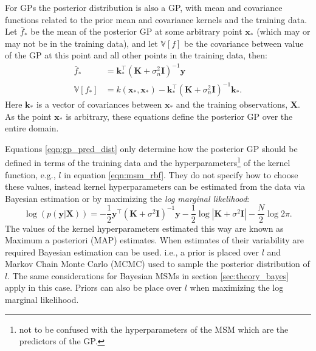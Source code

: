 For GPs the posterior distribution is also a GP, with mean and covariance functions related to the prior mean and covariance kernels and the training data\cite{rasmussenGaussianProcessesMachine2006}. Let $\bar{f}_{*}$ be the mean of the posterior GP at some arbitrary point $\mathbf{x}_{*}$ (which may or may not be in the training data), and let $\mathbb{V}\left[f\right]$ be the covariance between value of the GP at this point and all other points in the training data, then\cite{rasmussenGaussianProcessesMachine2006}:
\begin{equation}\label{eqn:gp_pred_dist}
\begin{aligned}
\bar{f}_{*} &=\mathbf{k}_{*}^{\top}\left(\mathbf{K}+\sigma_{n}^{2} \mathbf{I}\right)^{-1} \mathbf{y} \\
\mathbb{V}\left[f_{*}\right] &=k\left(\mathbf{x}_{*}, \mathbf{x}_{*}\right)-\mathbf{k}_{*}^{\top}\left(\mathbf{K}+\sigma_{n}^{2} \mathbf{I}\right)^{-1} \mathbf{k}_{*}.
\end{aligned}
\end{equation}
Here $\mathbf{k}_{*}$ is a vector of covariances between $\mathbf{x}_{*}$ and the training observations, $\mathbf{X}$. As the point $\mathbf{x}_{*}$ is arbitrary, these equations define the posterior GP over the entire domain. 

Equations \ref{eqn:gp_pred_dist} only determine how the posterior GP should be defined in terms of the training data and the hyperparameters\footnote{not to be confused with the hyperparameters of the MSM which are the predictors of the GP.} of the kernel function, e.g., $l$ in equation \ref{eqn:msm_rbf}.  They do not specify how to choose these values, instead kernel hyperparameters can be estimated from the data via Bayesian estimation or by maximizing the \emph{log marginal likelihood}\cite{rasmussenGaussianProcessesMachine2006}:
\begin{equation}\label{eqn:marg_llike}
\log{\left( p(\mathbf{y} | \mathbf{X})\right)}=-\frac{1}{2} \mathbf{y}^{\top}\left(\mathbf{K}+\sigma^{2} \mathbf{I}\right)^{-1} \mathbf{y}-\frac{1}{2} \log \left|\mathbf{K}+\sigma^{2} \mathbf{I}\right|-\frac{N}{2} \log 2 \pi.
\end{equation}
The values of the kernel hyperparameters estimated this way are known as Maximum a posteriori (MAP) estimates\cite{rasmussenGaussianProcessesMachine2006}. When estimates of their variability are required Bayesian estimation can be used\cite{gelmanBayesianDataAnalysis2014}. i.e., a prior is placed over $l$ and Markov Chain Monte Carlo (MCMC) used to sample the posterior distribution of $l$. The same considerations for Bayesian MSMs in section \ref{sec:theory_bayes} apply in this case. Priors can also be place over $l$ when maximizing the log marginal likelihood\cite{rasmussenGaussianProcessesMachine2006}.

